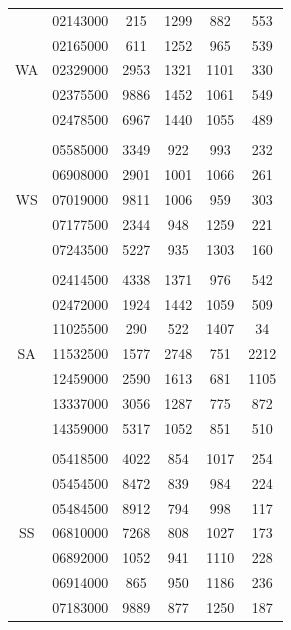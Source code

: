 \documentclass[draft,wrr]{AGUTeX}
\begin{document}
\begin{article}
\begin{table}
\begin{tabular}{cccccc}
& 02143000 & 215    & 1299  &  882 &   553\\
&  02165000 & 611   & 1252  &  965  &  539\\
WA&02329000&  2953    & 1321 &  1101   &   330\\   
&02375500 &  9886   & 1452  &  1061   & 549\\
&02478500  &  6967  & 1440  &  1055  &  489\\
\\
&05585000  &  3349      & 922      &    993     &  232    \\
&06908000  &  2901      & 1001     &    1066    &  261   \\
WS&07019000  &  9811      & 1006     &    959     &  303    \\
&07177500  &  2344      & 948      &    1259     &  221    \\
&07243500 & 5227  & 935  &  1303  &  160\\
\\
&02414500& 4338  & 1371 & 976 & 542  \\
&02472000&  1924 & 1442 &1059  &  509 \\
& 11025500&    290  &  522  & 1407   & 34  \\
SA&11532500 & 1577   & 2748 &  751  &  2212\\
&12459000&  2590 & 1613 & 681 & 1105  \\
&13337000& 3056  & 1287 & 775 &  872 \\
&14359000&  5317 & 1052 & 851 &  510 \\
\\
&05418500&4022   &854  &1017 & 254  \\
&05454500& 8472  &839  & 984 & 224  \\
&05484500& 8912  & 794 & 998 &  117 \\
SS&06810000& 7268  & 808 &1027  &173   \\
&06892000& 1052  & 941 &1110 & 228  \\
&06914000& 865  & 950 & 1186 & 236  \\
&07183000& 9889  & 877 & 1250 & 187  \\
\hline
\end{tabular}
 
\end{table}


\end{article}
\end{document}
